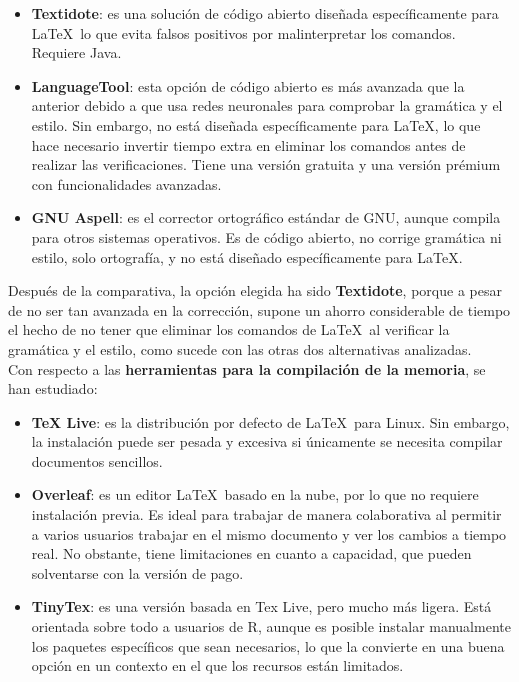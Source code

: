 \begin{itemize}
    \item \textbf{Textidote}: es una solución de código abierto diseñada específicamente para
    \LaTeX\, lo que evita falsos positivos por malinterpretar los comandos. Requiere Java.
    \item \textbf{LanguageTool}: esta opción de código abierto es más avanzada que la anterior 
    debido a que usa redes neuronales para comprobar la gramática y el estilo. 
    Sin embargo, no está diseñada específicamente para \LaTeX, lo que hace necesario 
    invertir tiempo extra en eliminar los comandos antes de realizar las verificaciones.
    Tiene una versión gratuita y una versión prémium con funcionalidades avanzadas.
    \item \textbf{GNU Aspell}: es el corrector ortográfico estándar de GNU, aunque compila para
    otros sistemas operativos. Es de código abierto, no corrige gramática ni estilo, solo
    ortografía, y no está diseñado específicamente para \LaTeX.
\end{itemize}

Después de la comparativa, la opción elegida ha sido \textbf{Textidote}, porque a pesar de 
no ser tan avanzada en la corrección, supone un ahorro considerable de tiempo el hecho de no 
tener que eliminar los comandos de \LaTeX\ al verificar la gramática y el estilo, como sucede
con las otras dos alternativas analizadas.
\\

Con respecto a las \textbf{herramientas para la compilación de la memoria}, se han estudiado:

\begin{itemize}
    \item \textbf{TeX Live}: es la distribución por defecto de \LaTeX\ para Linux. Sin embargo,
    la instalación puede ser pesada y excesiva si únicamente se necesita compilar documentos
    sencillos.
    \item \textbf{Overleaf}: es un editor \LaTeX\ basado en la nube, por lo que no requiere 
    instalación previa. Es ideal para trabajar de manera colaborativa al permitir
    a varios usuarios trabajar en el mismo documento y ver los cambios a tiempo real.
    No obstante, tiene limitaciones en cuanto a capacidad, que pueden solventarse con
    la versión de pago.
    \item \textbf{TinyTex}: es una versión basada en Tex Live, pero mucho más ligera. Está orientada
    sobre todo a usuarios de R, aunque es posible instalar manualmente los paquetes 
    específicos que sean necesarios, lo que la convierte en una buena opción en un contexto 
    en el que los recursos están limitados.
\end{itemize}

